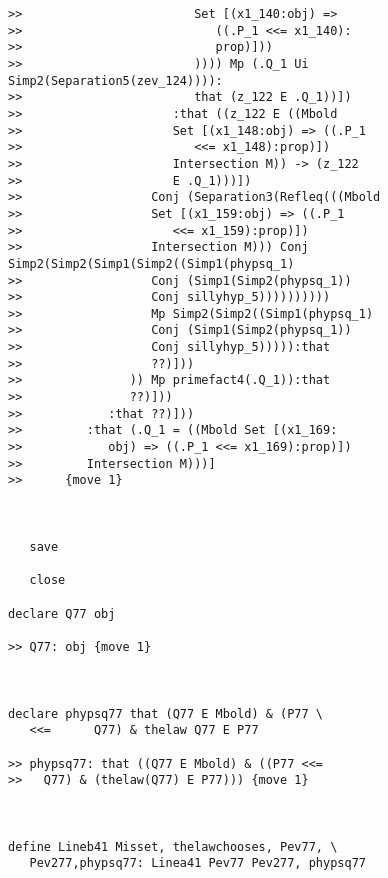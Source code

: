 \documentclass[12pt]{article}
\begin{document}
\begin{verbatim}
>>                        Set [(x1_140:obj) =>
>>                           ((.P_1 <<= x1_140):
>>                           prop)]))
>>                        )))) Mp (.Q_1 Ui Simp2(Separation5(zev_124)))):
>>                        that (z_122 E .Q_1))])
>>                     :that ((z_122 E ((Mbold
>>                     Set [(x1_148:obj) => ((.P_1
>>                        <<= x1_148):prop)])
>>                     Intersection M)) -> (z_122
>>                     E .Q_1)))])
>>                  Conj (Separation3(Refleq(((Mbold
>>                  Set [(x1_159:obj) => ((.P_1
>>                     <<= x1_159):prop)])
>>                  Intersection M))) Conj Simp2(Simp2(Simp1(Simp2((Simp1(phypsq_1)
>>                  Conj (Simp1(Simp2(phypsq_1))
>>                  Conj sillyhyp_5))))))))))
>>                  Mp Simp2(Simp2((Simp1(phypsq_1)
>>                  Conj (Simp1(Simp2(phypsq_1))
>>                  Conj sillyhyp_5))))):that
>>                  ??)]))
>>               )) Mp primefact4(.Q_1)):that
>>               ??)]))
>>            :that ??)]))
>>         :that (.Q_1 = ((Mbold Set [(x1_169:
>>            obj) => ((.P_1 <<= x1_169):prop)])
>>         Intersection M)))]
>>      {move 1}



   save

   close

declare Q77 obj

>> Q77: obj {move 1}



declare phypsq77 that (Q77 E Mbold) & (P77 \
   <<=      Q77) & thelaw Q77 E P77

>> phypsq77: that ((Q77 E Mbold) & ((P77 <<=
>>   Q77) & (thelaw(Q77) E P77))) {move 1}



define Lineb41 Misset, thelawchooses, Pev77, \
   Pev277,phypsq77: Linea41 Pev77 Pev277, phypsq77



\end{verbatim}
\end{document}
